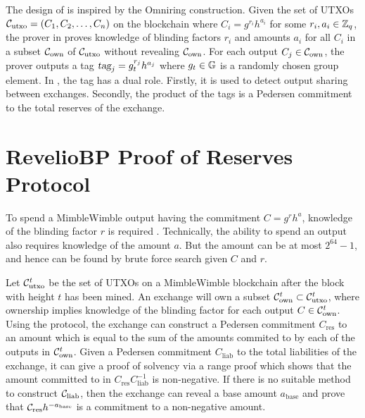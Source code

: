 The design of \RB is inspired by the Omniring construction. Given the set of UTXOs $\mathcal{C}_{\text{utxo}}=(C_1,C_2,\ldots,C_n)$ on the blockchain where $C_i = g^{r_i}h^{a_i}$ for some $r_i, a_i \in \mathbb{Z}_q$, the prover in \RPlus proves knowledge of blinding factors $r_i$ and amounts $a_i$ for all $C_i$ in a subset $\mathcal{C}_{\text{own}}$ of $\mathcal{C}_{\text{utxo}}$ without revealing $\mathcal{C}_{\text{own}}$. For each output $C_j \in \mathcal{C}_{\text{own}}$, the prover outputs a tag $\textsl{tag}_j = g_t^{r_j}h^{a_j}$ where $g_t \in \mathbb{G}$ is a randomly chosen group element. In \Rplus, the tag has a dual role. Firstly, it is used to detect output sharing between exchanges. Secondly, the product of the tags is a Pedersen commitment to the total reserves of the exchange.

\vspace{-1pt}
\section{\textnormal{{\selectfont RevelioBP}} Proof of Reserves Protocol}
\label{scnSecurityPropertiesDefiniton}

To spend a MimbleWimble output having the commitment $C = g^r h^a$, knowledge of the blinding factor $r$ is required \cite{GrinDocOnGithub}.
Technically, the ability to spend an output also requires knowledge of the amount $a$. But the amount can be at most $2^{64}-1$, and hence can be found by brute force search given $C$ and $r$.

Let $\mathcal{C}_{\text{utxo}}^t$ be the set of UTXOs on a MimbleWimble blockchain after the block with height $t$ has been mined. An exchange will own a subset $\mathcal{C}_{\text{own}}^t \subset \mathcal{C}_{\text{utxo}}^t$, where ownership implies knowledge of the blinding factor for each output $C \in \mathcal{C}_{\text{own}}^t$.  Using the \RB protocol, the exchange can construct a Pedersen commitment $C_{\text{res}}$ to an amount which is equal to the sum of the amounts commited to by each of the outputs in $\mathcal{C}_{\text{own}}^t$.  Given a Pedersen commitment $C_{\text{liab}}$ to the total liabilities of the exchange, it can give a proof of solvency via a range proof which shows that the amount committed to in $C_{\text{res}}C_{\text{liab}}^{-1}$ is non-negative. If there is no suitable method to construct $\mathcal{C}_{\text{liab}}$, then the exchange can reveal a base amount $a_{\text{base}}$ and prove that $\mathcal{C}_{\text{res}}h^{-a_{\text{base}}}$ is a commitment to a non-negative amount.

